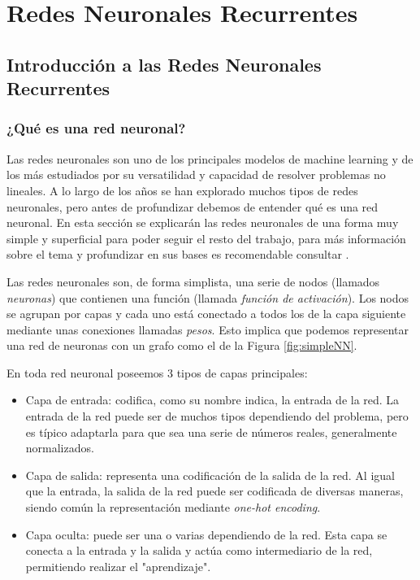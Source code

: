 \section{Redes Neuronales Recurrentes}
\label{sec:RNR}
    \subsection{Introducción a las Redes Neuronales Recurrentes}
    \label{subsec:introRNR}

    \subsubsection{¿Qué es una red neuronal?}
    \label{subsub:introRedesNeuronales}
    Las redes neuronales son uno de los principales modelos de machine learning y de los más estudiados por su versatilidad y capacidad de resolver problemas no lineales. A lo largo de los años se han explorado muchos tipos de redes neuronales, pero antes de profundizar debemos de entender qué es una red neuronal. En esta sección se explicarán las redes neuronales de una forma muy simple y superficial para poder seguir el resto del trabajo, para más información sobre el tema y profundizar en sus bases es recomendable consultar \cite{M.A.Nielsen}.
    
    Las redes neuronales son, de forma simplista, una serie de nodos (llamados \textit{neuronas}) que contienen una función (llamada \textit{función de activación}). Los nodos se agrupan por capas y cada uno está conectado a todos los de la capa siguiente mediante unas conexiones llamadas \textit{pesos}. Esto implica que podemos representar una red de neuronas con un grafo como el de la Figura \ref{fig:simpleNN}.

    En toda red neuronal poseemos 3 tipos de capas principales: 
    
    \begin{itemize}
        \item Capa de entrada: codifica, como su nombre indica, la entrada de la red. La entrada de la red puede ser de muchos tipos dependiendo del problema, pero es típico adaptarla para que sea una serie de números reales, generalmente normalizados.
        \item Capa de salida: representa una codificación de la salida de la red. Al igual que la entrada, la salida de la red puede ser codificada de diversas maneras, siendo común la representación mediante \textit{one-hot encoding}.
        \item Capa oculta: puede ser una o varias dependiendo de la red. Esta capa se conecta a la entrada y la salida y actúa como intermediario de la red, permitiendo realizar el "aprendizaje". 
    \end{itemize}

